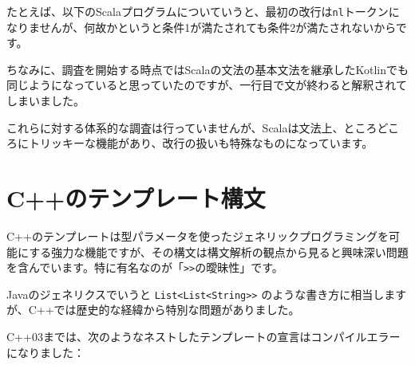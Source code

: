 たとえば、以下のScalaプログラムについていうと、最初の改行は\texttt{nl}トークンになりませんが、何故かというと条件1が満たされても条件2が満たされないからです。

\begin{Shaded}
\begin{Highlighting}[]
\NormalTok{      + }
\end{Highlighting}
\end{Shaded}

ちなみに、調査を開始する時点ではScalaの文法の基本文法を継承したKotlinでも同じようになっていると思っていたのですが、一行目で文が終わると解釈されてしまいました。

\begin{Shaded}
\begin{Highlighting}[]
 \NormalTok{ = }
\NormalTok{      + } 
\end{Highlighting}
\end{Shaded}

これらに対する体系的な調査は行っていませんが、Scalaは文法上、ところどころにトリッキーな機能があり、改行の扱いも特殊なものになっています。

\hypertarget{chapter7-cux306eux30c6ux30f3ux30d7ux30ecux30fcux30c8ux69cbux6587}{%
\section{C++のテンプレート構文}\label{chapter7-cux306eux30c6ux30f3ux30d7ux30ecux30fcux30c8ux69cbux6587}}

C++のテンプレートは型パラメータを使ったジェネリックプログラミングを可能にする強力な機能ですが、その構文は構文解析の観点から見ると興味深い問題を含んでいます。特に有名なのが「\texttt{\textgreater{}\textgreater{}}の曖昧性」です。

Javaのジェネリクスでいうと
\texttt{List\textless{}List\textless{}String\textgreater{}\textgreater{}}
のような書き方に相当しますが、C++では歴史的な経緯から特別な問題がありました。

C++03までは、次のようなネストしたテンプレートの宣言はコンパイルエラーになりました：

\begin{Shaded}
\begin{Highlighting}[]
\end{Highlighting}
\end{Shaded}

